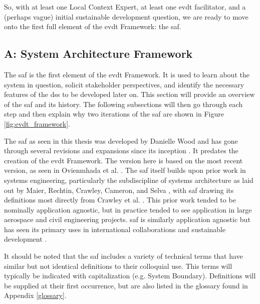So, with at least one Local Context Expert, at least one \ac{evdt} facilitator, and a (perhaps vague) initial sustainable development question, we are ready to move onto the first full element of the \ac{evdt} Framework: the \ac{saf}.


\subsection{A: System Architecture Framework} \label{sec:saf}

The \acf{saf} is the first element of the \ac{evdt} Framework. It is used to learn about the system in question, solicit stakeholder perspectives, and identify the necessary features of the \ac{dss} to be developed later on. This section will provide an overview of the \ac{saf} and its history. The following subsections will then go through each step and then explain why two iterations of the \ac{saf} are shown in Figure \ref{fig:evdt_framework}.

The \ac{saf} as seen in this thesis was developed by Danielle Wood and has gone through several revisions and expansions since its inception \cite{woodAnalysisTechnologyTransfer2013, woodApplyingSystemsArchitecture2014, kazanskyCurrentPotentialRole2016}. It predates the creation of the \ac{evdt} Framework. The version here is based on the most recent version, as seen in Ovienmhada et al. \cite{ovienmhadaInclusiveDesignEarth2021}. The \ac{saf} itself builds upon prior work in systems engineering, particularly the subdiscipline of systems architecture as laid out by Maier, Rechtin, Crawley, Cameron, and Selva \cite{crawley2004, crawleySystemArchitectureStrategy2015, maierArtSystemsArchitecting2009}, with \ac{saf} drawing its definitions most directly from Crawley et al. \cite{crawley2004}. This prior work tended to be nominally application agnostic, but in practice tended to see application in large aerospace and civil engineering projects. \ac{saf} is similarly application agnostic but has seen its primary uses in international collaborations \cite{pfotenhauerArchitectingComplexInternational2016} and sustainable development \cite{ovienmhadaInclusiveDesignEarth2021}. 

It should be noted that the \ac{saf} includes a variety of technical terms that have similar but not identical definitions to their colloquial use. This terms will typically be indicated with capitalization (e.g. System Boundary). Definitions will be supplied at their first occurrence, but are also listed in the glossary found in Appendix \ref{glossary}.

